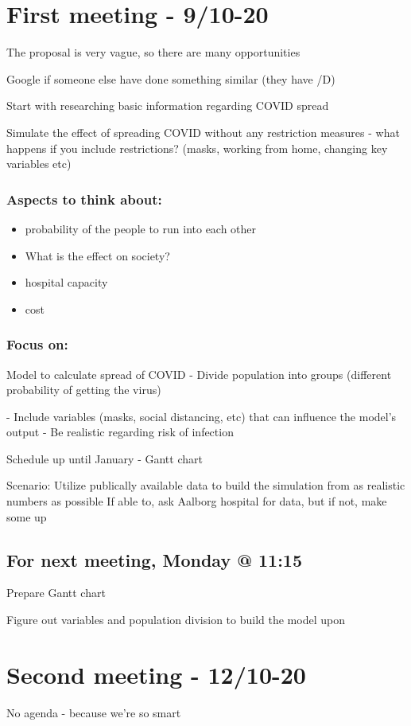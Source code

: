 \section{First meeting - 9/10-20}
The proposal is very vague, so there are many opportunities

Google if someone else have done something similar (they have /D) 

Start with researching basic information regarding COVID spread 

Simulate the effect of spreading COVID without any restriction measures
- what happens if you include restrictions? (masks, working from home, changing key variables etc)

\subsubsection{Aspects to think about:}
\begin{itemize}
    \item probability of the people to run into each other
    \item What is the effect on society?
        \item hospital capacity
        \item cost
\end{itemize}

\subsubsection{Focus on:}
Model to calculate spread of COVID
- Divide population into groups (different probability of getting the virus)

- Include variables (masks, social distancing, etc) that can influence the model's output
- Be realistic regarding risk of infection

Schedule up until January
- Gantt chart

Scenario:
Utilize publically available data to build the simulation from as realistic numbers as possible
If able to, ask Aalborg hospital for data, but if not, make some up

\subsection{For next meeting, Monday @ 11:15}
Prepare Gantt chart

Figure out variables and population division to build the model upon

\section{Second meeting - 12/10-20}
No agenda - because we're so smart

